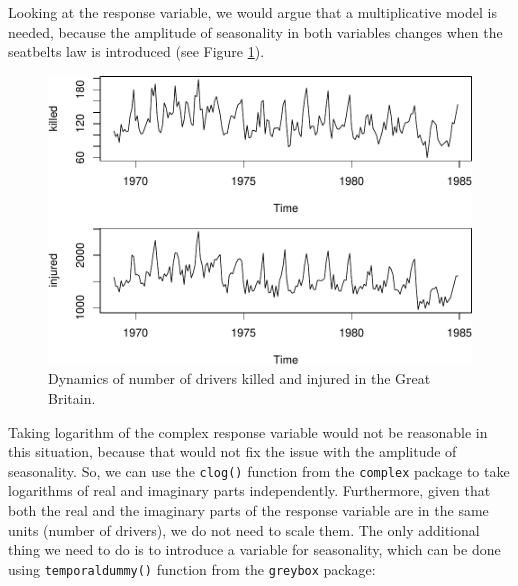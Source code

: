 \documentclass[
]{book}
\newenvironment{Shaded}{\begin{snugshade}}{\end{snugshade}}
\newcommand{\AttributeTok}[1]{\textcolor[rgb]{0.77,0.63,0.00}{#1}}
\newcommand{\ConstantTok}[1]{\textcolor[rgb]{0.00,0.00,0.00}{#1}}
\newcommand{\DecValTok}[1]{\textcolor[rgb]{0.00,0.00,0.81}{#1}}
\newcommand{\FunctionTok}[1]{\textcolor[rgb]{0.00,0.00,0.00}{#1}}
\newcommand{\NormalTok}[1]{#1}
\newcommand{\OtherTok}[1]{\textcolor[rgb]{0.56,0.35,0.01}{#1}}
\newcommand{\SpecialCharTok}[1]{\textcolor[rgb]{0.00,0.00,0.00}{#1}}
\newcommand{\StringTok}[1]{\textcolor[rgb]{0.31,0.60,0.02}{#1}}
\begin{document}
Looking at the response variable, we would argue that a multiplicative model is needed, because the amplitude of seasonality in both variables changes when the seatbelts law is introduced (see Figure \ref{fig:seatbeltsData}).

\begin{figure}
\centering
\includegraphics{Svetunkov---Svetunkov---Complex-Valued-Econometrics_files/figure-latex/seatbeltsData-1.pdf}
\caption{\label{fig:seatbeltsData}Dynamics of number of drivers killed and injured in the Great Britain.}
\end{figure}

Taking logarithm of the complex response variable would not be reasonable in this situation, because that would not fix the issue with the amplitude of seasonality. So, we can use the \texttt{clog()} function from the \texttt{complex} package to take logarithms of real and imaginary parts independently. Furthermore, given that both the real and the imaginary parts of the response variable are in the same units (number of drivers), we do not need to scale them. The only additional thing we need to do is to introduce a variable for seasonality, which can be done using \texttt{temporaldummy()} function from the \texttt{greybox} package:

\begin{Shaded}
\end{Shaded}
\end{document}
